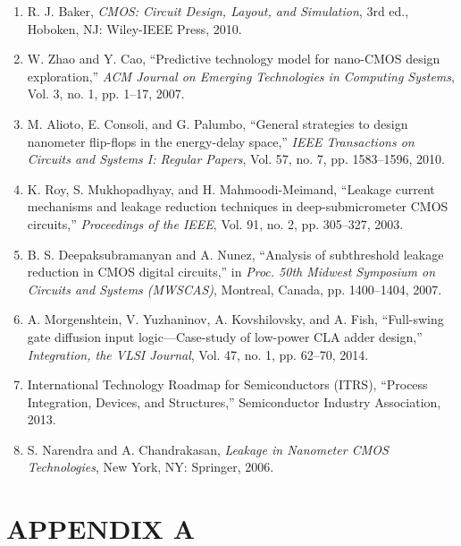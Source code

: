 \documentclass[12pt,a4paper,oneside]{report}
\begin{document}
\begin{enumerate}
\item[{[9]}] R. J. Baker, \textit{CMOS: Circuit Design, Layout, and Simulation}, 3rd ed., Hoboken, NJ: Wiley-IEEE Press, 2010.

\item[{[10]}] W. Zhao and Y. Cao, ``Predictive technology model for nano-CMOS design exploration,'' \textit{ACM Journal on Emerging Technologies in Computing Systems}, Vol. 3, no. 1, pp. 1--17, 2007.

\item[{[11]}] M. Alioto, E. Consoli, and G. Palumbo, ``General strategies to design nanometer flip-flops in the energy-delay space,'' \textit{IEEE Transactions on Circuits and Systems I: Regular Papers}, Vol. 57, no. 7, pp. 1583--1596, 2010.

\item[{[12]}] K. Roy, S. Mukhopadhyay, and H. Mahmoodi-Meimand, ``Leakage current mechanisms and leakage reduction techniques in deep-submicrometer CMOS circuits,'' \textit{Proceedings of the IEEE}, Vol. 91, no. 2, pp. 305--327, 2003.

\item[{[13]}] B. S. Deepaksubramanyan and A. Nunez, ``Analysis of subthreshold leakage reduction in CMOS digital circuits,'' in \textit{Proc. 50th Midwest Symposium on Circuits and Systems (MWSCAS)}, Montreal, Canada, pp. 1400--1404, 2007.

\item[{[14]}] A. Morgenshtein, V. Yuzhaninov, A. Kovshilovsky, and A. Fish, ``Full-swing gate diffusion input logic---Case-study of low-power CLA adder design,'' \textit{Integration, the VLSI Journal}, Vol. 47, no. 1, pp. 62--70, 2014.

\item[{[15]}] International Technology Roadmap for Semiconductors (ITRS), ``Process Integration, Devices, and Structures,'' Semiconductor Industry Association, 2013.

\item[{[16]}] S. Narendra and A. Chandrakasan, \textit{Leakage in Nanometer CMOS Technologies}, New York, NY: Springer, 2006.
\end{enumerate}


\clearpage
\chapter*{APPENDIX A}
\end{document}
